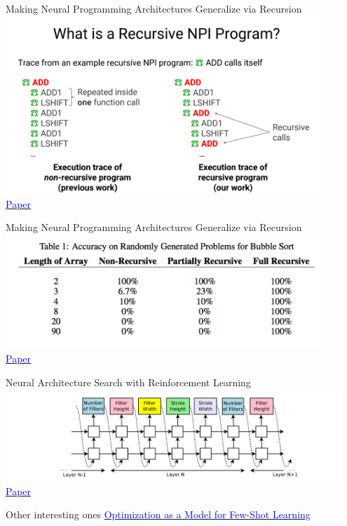 \documentclass[]{beamer}
\begin{document}
\begin{frame}{Making Neural Programming Architectures Generalize via Recursion}
\centering
\includegraphics[width=0.9\textwidth]{figures/cai-recursive-npi} \\
\href{https://openreview.net/forum?id=BkbY4psgg&noteId=BkbY4psgg}{\textcolor{blue}{Paper}}
\end{frame}

\begin{frame}{Making Neural Programming Architectures Generalize via Recursion}
\centering
\includegraphics[width=0.9\textwidth]{figures/cai-results} \\
\href{https://openreview.net/forum?id=BkbY4psgg&noteId=BkbY4psgg}{\textcolor{blue}{Paper}}
\end{frame}

\begin{frame}{Neural Architecture Search with Reinforcement Learning}
\centering
\includegraphics[width=0.95\textwidth]{figures/zoph-controller} \\
\href{https://openreview.net/forum?id=r1Ue8Hcxg&noteId=r1Ue8Hcxg}{\textcolor{blue}{Paper}}
\end{frame}

\begin{frame}{Other interesting ones}
\centering
\href{https://openreview.net/forum?id=rJY0-Kcll&noteId=rJY0-Kcll}{\textcolor{blue}{Optimization as a Model for Few-Shot Learning}}
\end{frame}
\end{document}
